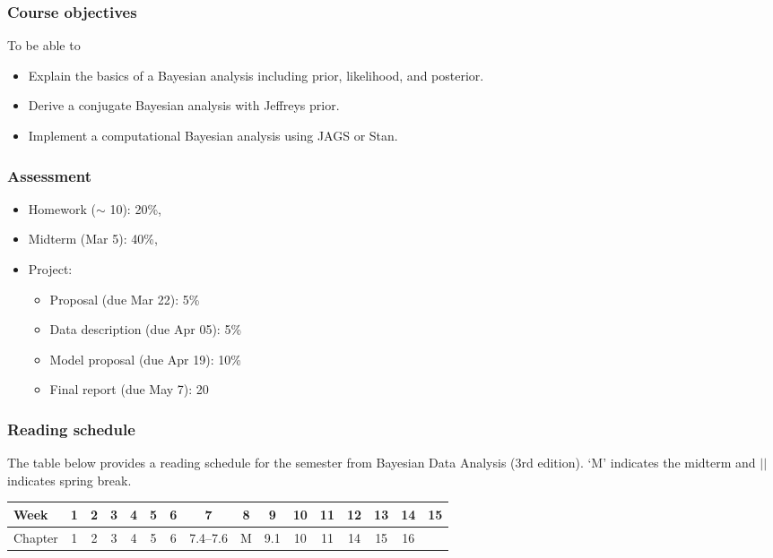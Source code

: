 \documentclass[12pt]{article}
\begin{document}
\subsubsection*{Course objectives}
To be able to
\begin{itemize}
\item Explain the basics of a Bayesian analysis including prior, likelihood, and posterior.
\item Derive a conjugate Bayesian analysis with Jeffreys prior.
\item Implement a computational Bayesian analysis using JAGS or Stan.
\end{itemize}

\subsubsection*{Assessment}

\begin{itemize}
\item Homework ($\sim$ 10): 20\%,
\item Midterm (Mar 5): 40\%,
\item Project:
  \begin{itemize}
  \item Proposal (due Mar 22): 5\%
  \item Data description (due Apr 05): 5\%
  \item Model proposal (due Apr 19): 10\%
  \item Final report (due May 7): 20%
  \end{itemize}
\end{itemize}

\subsubsection*{Reading schedule}

The table below provides a reading schedule for the semester from
Bayesian Data Analysis (3rd edition).
`M' indicates the midterm and $\vert\vert$ indicates spring break.

\vspace{0.2in}

\begin{tabular}{|l|cccccccc||ccccccc|}
\hline
Week    & 1 & 2 & 3 & 4 & 5 & 6 & 7        & 8    & 9 & 10 & 11 & 12 & 13 & 14 & 15 \\
\hline
Chapter & 1 & 2 & 3 & 4 & 5 & 6 & 7.4--7.6 & M & 9.1 & 10 & 11 & 14 & 15 & 16 & \\
\hline
\end{tabular}
\end{document}
